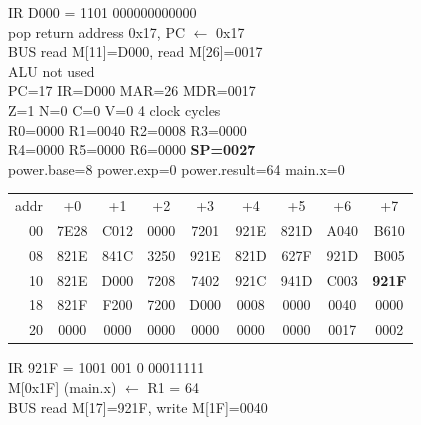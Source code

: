 \noindent\begin{tcolorbox}[stepbox, title={Step 36 \hfill PC 11 \quad RET}]
\textcolor{dim}{IR} D000 = 1101 000000000000\\
pop return address 0x17, PC $\leftarrow$ 0x17\\
\textcolor{dim}{BUS} read M[11]=D000, read M[26]=0017\\
\textcolor{dim}{ALU} \textcolor{dim}{not used}\\
PC=17 IR=D000 MAR=26 MDR=0017\\
Z=1 N=0 C=0 V=0 \hfill \textcolor{dim}{4 clock cycles}\\
R0=0000 R1=0040 R2=0008 R3=0000\\
R4=0000 R5=0000 R6=0000 \textcolor{wrt}{\textbf{SP=0027}}\\
\textcolor{dim}{power.base=8  power.exp=0  power.result=64  main.x=0}\\[1pt]
{\setlength{\tabcolsep}{1.6pt}\begin{tabular}{@{}r*{8}{c}@{}}
\textcolor{dim}{addr} & \textcolor{dim}{+0} & \textcolor{dim}{+1} & \textcolor{dim}{+2} & \textcolor{dim}{+3} & \textcolor{dim}{+4} & \textcolor{dim}{+5} & \textcolor{dim}{+6} & \textcolor{dim}{+7}\\
\textcolor{dim}{00} & 7E28 & C012 & 0000 & 7201 & 921E & 821D & A040 & B610\\
\textcolor{dim}{08} & 821E & 841C & 3250 & 921E & 821D & 627F & 921D & B005\\
\textcolor{dim}{10} & 821E & D000 & 7208 & 7402 & 921C & 941D & C003 & \cellcolor{pcc}\textbf{921F}\\
\textcolor{dim}{18} & 821F & F200 & 7200 & D000 & \cellcolor{datac}0008 & \cellcolor{datac}0000 & \cellcolor{datac}0040 & \cellcolor{datac}0000\\
\textcolor{dim}{20} & \cellcolor{stackc}0000 & \cellcolor{stackc}0000 & \cellcolor{stackc}0000 & \cellcolor{stackc}0000 & \cellcolor{stackc}0000 & \cellcolor{stackc}0000 & \cellcolor{stackc}0017 & \cellcolor{stackc}0002\\
\end{tabular}}
\end{tcolorbox}\hfill\begin{tcolorbox}[stepbox, title={Step 37 \hfill PC 17 \quad ST R1, main.x}]
\textcolor{dim}{IR} 921F = 1001 001 0 00011111\\
M[0x1F] (main.x) $\leftarrow$ R1 = 64\\
\textcolor{dim}{BUS} read M[17]=921F, \textcolor{wrt}{write M[1F]=0040}\\

\end{tcolorbox}
